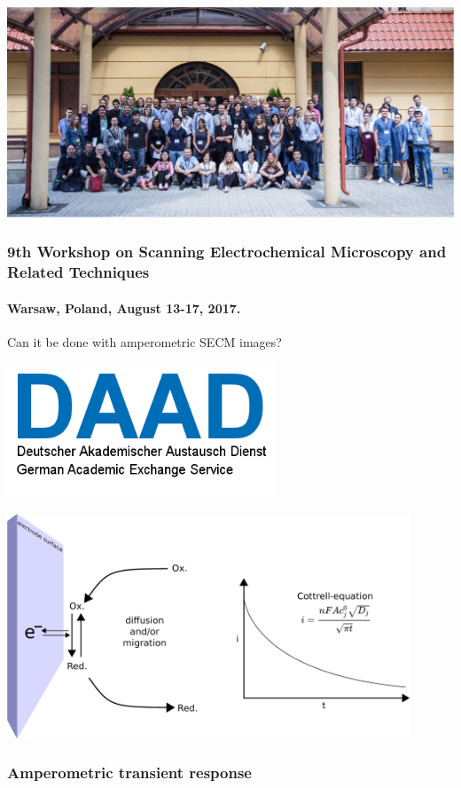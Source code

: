 \documentclass{beamer}
\begin{document}
\begin{frame}
	\centering
	\includegraphics[width=1\textwidth]{poland.eps}
	\frametitle{9th Workshop on Scanning Electrochemical Microscopy and Related Techniques}
	\framesubtitle{Warsaw, Poland, August 13-17, 2017.}
\end{frame}

\begin{frame}[plain]
\centering
Can it be done with amperometric SECM images?
\end{frame}

\begin{frame}[plain]
\centering
\includegraphics[width=0.6\textwidth]{daad.png}
\end{frame}


\begin{frame}
        \centering
        \includegraphics[width=0.9\textwidth]{cottrell.eps}
        \frametitle{Amperometric transient response}
\end{frame}
\end{document}
